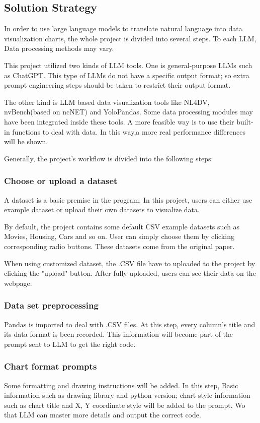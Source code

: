 \documentclass[conference]{IEEEtran}
\begin{document}
    \subsection{Solution Strategy}
    In order to use large language models to translate natural language into data visualization charts, the whole project is divided into several steps. To each LLM, Data processing methods may vary.
    
    This project utilized two kinds of LLM tools. One is general-purpose LLMs such as ChatGPT. This type of LLMs do not have a specific output format; so extra prompt engineering steps should be taken to restrict their output format.

    The other kind is LLM based data visualization tools like NL4DV, nvBench(based on ncNET) and YoloPandas. Some data processing modules may have been integrated inside these tools.\cite{b2,b3,b4} A more feasible way is to use their built-in functions to deal with data. In this way,a more real performance differences will be shown.
    
    Generally, the project's workflow is divided into the following steps:
    
        \subsubsection{Choose or upload a dataset}
            A dataset is a basic premise in the program. In this project, users can either use example dataset or upload their own datasets to visualize data.

            By default, the project contains some default CSV example datasets such as Movies, Housing, Cars and so on. User can simply choose them by clicking corresponding radio buttons. These datasets come from the original paper.

            When using customized dataset, the .CSV file have to uploaded to the project by clicking the "upload" button. After fully uploaded, users can see their data on the webpage.
        
        \subsubsection{Data set preprocessing}
            Pandas is imported to deal with .CSV files. At this step, every column's title and its data format is been recorded. This information will become part of the prompt sent to LLM to get the right code.

        \subsubsection{Chart format prompts}
            Some formatting and drawing instructions will be added. In this step, Basic information such as drawing library and python version; chart style information such as chart title and X, Y coordinate style will be added to the prompt. Wo that LLM can master more details and output the correct code.
\end{document}

